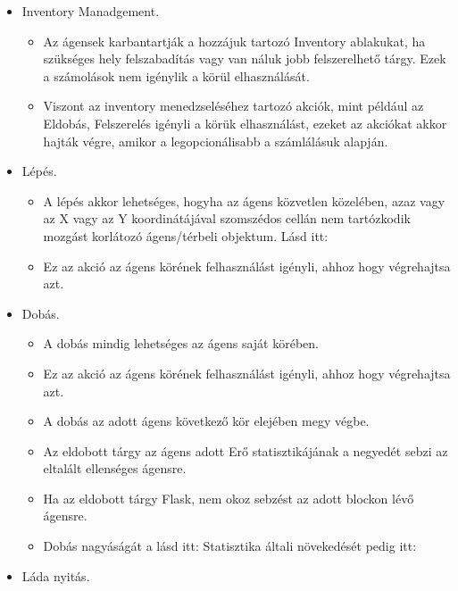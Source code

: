 \begin{itemize}
    \item Inventory Manadgement.
    
    \begin{itemize}
        \item Az ágensek karbantartják a hozzájuk tartozó Inventory ablakukat, ha szükséges hely felszabadítás vagy van náluk jobb felszerelhető tárgy. Ezek a számolások nem igénylik a körül elhasználását.
        \item Viszont az inventory menedzseléséhez tartozó akciók, mint például az Eldobás, Felszerelés igényli a körük elhasználást, ezeket az akciókat akkor hajták végre, amikor a legopcionálisabb a számlálásuk alapján.
    \end{itemize}

    \item Lépés. 
    
    \begin{itemize}
        \item A lépés akkor lehetséges, hogyha az ágens közvetlen közelében, azaz vagy az X vagy az Y koordinátájával szomszédos cellán nem tartózkodik mozgást korlátozó ágens/térbeli objektum. Lásd itt: 
        \item Ez az akció az ágens körének felhasználást igényli, ahhoz hogy végrehajtsa azt.
    \end{itemize}

    \item Dobás. 
    
    \begin{itemize}
        \item A dobás mindig lehetséges az ágens saját körében.
        \item Ez az akció az ágens körének felhasználást igényli, ahhoz hogy végrehajtsa azt.
        \item A dobás az adott ágens következő kör elejében megy végbe.
        \item Az eldobott tárgy az ágens adott Erő statisztikájának a negyedét sebzi az eltalált ellenséges ágensre.
        \item Ha az eldobott tárgy Flask, nem okoz sebzést az adott blockon lévő ágensre.
        \item Dobás nagyáságát a lásd itt:  Statisztika általi növekedését pedig itt: 
    \end{itemize}

    \item Láda nyitás. 
    

\end{itemize}
